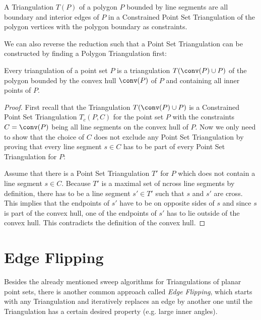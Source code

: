 \begin{definition}
  A Triangulation \(T(P)\) of a polygon \(P\) bounded by line segments
  are all boundary and interior edges of \(P\)
  in a Constrained Point Set Triangulation of the polygon vertices
  with the polygon boundary as constraints.
\end{definition}

We can also reverse the reduction such that a Point Set Triangulation
can be constructed by finding a Polygon Triangulation first:

\begin{theorem}
  Every triangulation of a point set \(P\)
  is a triangulation \(T(\conv(P) \cup P)\)
  of the polygon bounded by the convex hull \(\conv(P)\) of \(P\)
  and containing all inner points of \(P\).
  \begin{proof}
  First recall that the Triangulation \(T(\conv(P) \cup P)\)
  is a Constrained Point Set Triangulation \(T_c(P,C)\) for the point
  set \(P\) with the constraints \(C = \conv(P)\) being all line
  segments on the convex hull of \(P\). Now we only need to show that
  the choice of \(C\) does not exclude any Point Set Triangulation by
  proving that every line segment \(s \in C\) has to be part of every
  Point Set Triangulation for \(P\):
  
  Assume that there is a Point Set Triangulation \(T'\) for \(P\)
  which does not contain a line segment \(s \in C\). Because \(T'\)
  is a maximal set of \gls{ncross} line segments by definition,
  there has to be a line segment \(s' \in T'\) such that \(s\) and
  \(s'\) are \gls{cross}. This implies that the endpoints of \(s'\)
  have to be on opposite sides of \(s\) and since \(s\) is part of
  the convex hull, one of the endpoints of \(s'\) has to lie outside
  of the convex hull. This contradicts the definition of the convex
  hull.
  \end{proof}
\end{theorem}

\section{Edge Flipping}
Besides the already mentioned sweep algorithms for Triangulations of
planar point sets, there is another common approach called
\emph{Edge Flipping}, which starts with any Triangulation and 
iteratively replaces an edge by another one until the Triangulation 
has a certain desired property (e.g. large inner angles).

